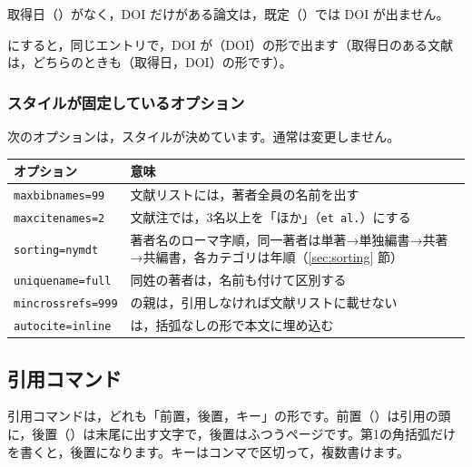 取得日（）がなく，DOI だけがある論文は，既定（）では DOI が出ません。


 にすると，同じエントリで，DOI が（DOI）の形で出ます（取得日のある文献は，どちらのときも（取得日，DOI）の形です）。

{\toggletrue{bbx:doi}}

\subsubsection{スタイルが固定しているオプション}
次のオプションは，スタイルが決めています。通常は変更しません。

\begin{center}\small
\begin{tabular}{@{}L{0.30\textwidth}L{0.55\textwidth}@{}}
\toprule
\textbf{オプション} & \textbf{意味} \\
\midrule
\texttt{maxbibnames=99} & 文献リストには，著者全員の名前を出す \\
\texttt{maxcitenames=2} & 文献注では，3名以上を「ほか」（\texttt{et al.}）にする \\
\texttt{sorting=nymdt} & 著者名のローマ字順，同一著者は単著→単独編書→共著→共編書，各カテゴリは年順（\ref{sec:sorting} 節） \\
\texttt{uniquename=full} & 同姓の著者は，名前も付けて区別する \\
\texttt{mincrossrefs=999} &  の親は，引用しなければ文献リストに載せない \\
\texttt{autocite=inline} &  は，括弧なしの形で本文に埋め込む \\
\bottomrule
\end{tabular}
\end{center}

\subsection{引用コマンド}\label{sec:cite}
引用コマンドは，どれも「前置，後置，キー」の形です。前置（）は引用の頭に，後置（）は末尾に出す文字で，後置はふつうページです。第1の角括弧だけを書くと，後置になります。キーはコンマで区切って，複数書けます。

